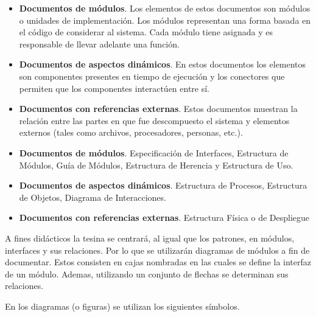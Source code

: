 \begin{itemize}
\item \textbf{Documentos de módulos}. Los elementos de estos documentos son módulos o unidades de implementación. Los módulos representan una forma basada en el código de considerar al sistema. Cada módulo tiene asignada y es responsable de llevar adelante una función.
\item \textbf{Documentos de aspectos dinámicos}. En estos documentos los elementos son componentes presentes en tiempo de ejecución y los conectores que permiten que los componentes interactúen entre sí.
\item \textbf{Documentos con referencias externas}. Estos documentos muestran la relación entre las partes en que fue descompuesto el sistema y elementos externos (tales como archivos, procesadores, personas, etc.).
\item \textbf{Documentos de módulos}. Especificación de Interfaces, Estructura de Módulos, Guía de Módulos, Estructura de Herencia y Estructura de Uso.
\item \textbf{Documentos de aspectos dinámicos}. Estructura de Procesos, Estructura de Objetos, Diagrama
de Interacciones.
\item \textbf{Documentos con referencias externas}. Estructura Física o de Despliegue
\end{itemize}

A fines didácticos la tesina se centrará, al igual que los patrones, en módulos, interfaces y sus relaciones. Por lo que se utilizarán diagramas de módulos a fin de documentar. Estos consisten en cajas nombradas en las cuales se define la interfaz de un módulo. Ademas, utilizando un conjunto de flechas se determinan sus relaciones.

En los diagramas (o figuras) se utilizan los siguientes símbolos. 

